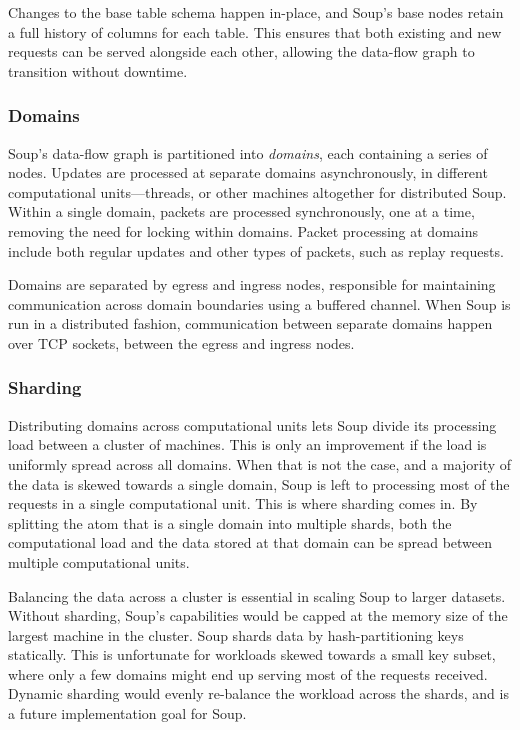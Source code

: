 
Changes to the base table schema happen in-place, and Soup's base nodes retain a
full history of columns for each table. This ensures that both existing and new
requests can be served alongside each other, allowing the data-flow graph to
transition without downtime.

\subsubsection{Domains}

Soup's data-flow graph is partitioned into \textit{domains}, each containing a
series of nodes. Updates are processed at separate domains asynchronously, in
different computational units---threads, or other machines altogether for
distributed Soup. Within a single domain, packets are processed synchronously,
one at a time, removing the need for locking within domains. Packet processing
at domains include both regular updates and other types of packets, such as
replay requests.


Domains are separated by egress and ingress nodes, responsible for maintaining
communication across domain boundaries using a buffered channel. When Soup is
run in a distributed fashion, communication between separate domains happen
over TCP sockets, between the egress and ingress nodes.

\subsubsection{Sharding}

Distributing domains across computational units lets Soup divide its processing
load between a cluster of machines. This is only an improvement if the load is
uniformly spread across all domains. When that is not the case, and a majority
of the data is skewed towards a single domain, Soup is left to processing most
of the requests in a single computational unit. This is where sharding comes in.
By splitting the atom that is a single domain into multiple shards, both the
computational load and the data stored at that domain can be spread between
multiple computational units.


Balancing the data across a cluster is essential in scaling Soup to larger
datasets. Without sharding, Soup's capabilities would be capped at the memory
size of the largest machine in the cluster. Soup shards data by
hash-partitioning keys statically. This is unfortunate for workloads skewed
towards a small key subset, where only a few domains might end up serving most
of the requests received. Dynamic sharding would evenly re-balance the workload
across the shards, and is a future implementation goal for Soup.

